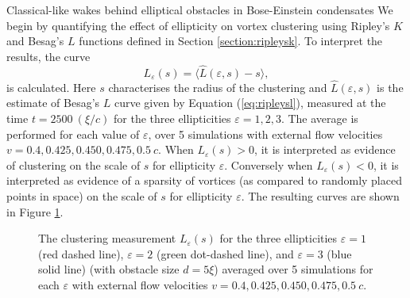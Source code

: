 \begin{chapter}{\label{cha:wake}Classical-like wakes behind elliptical obstacles in Bose-Einstein condensates}
We begin by quantifying the effect of ellipticity on vortex clustering using Ripley's $K$ and Besag's $L$ functions defined in Section \ref{section:ripleysk}. To interpret the results, the curve 
\begin{equation}
  L_\varepsilon(s) = \langle \hat{L}(\varepsilon,s) - s \rangle,
\end{equation}
is calculated. Here $s$ characterises the radius of the clustering and $\hat{L}(\varepsilon,s)$ is the estimate of Besag's $L$ curve given by Equation (\ref{eq:ripleysl}), measured at the time $t=2500~(\xi/c)$ for the three ellipticities $\varepsilon=1, 2, 3$. The average is performed for each value of $\varepsilon$, over 5 simulations with external flow velocities $v = 0.4,0.425,0.450,0.475,0.5~c$. When $L_\varepsilon(s)>0$, it is interpreted as evidence of clustering on the scale of $s$ for ellipticity $\varepsilon$. Conversely when $L_\varepsilon(s)<0$, it is interpreted as evidence of a sparsity of vortices (as compared to randomly placed points in space) on the scale of $s$ for ellipticity $\varepsilon$. The resulting curves are shown in Figure \ref{fig:ripleyLwake}.

\begin{figure}
\begin{center}
\end{center}
\caption{\label{fig:ripleyLwake} The clustering measurement $L_\varepsilon(s)$ for the three ellipticities $\varepsilon=1$ (red dashed line), $\varepsilon=2$ (green dot-dashed line), and $\varepsilon=3$ (blue solid line) (with obstacle size $d=5\xi$) averaged over 5 simulations for each $\varepsilon$ with external flow velocities $v = 0.4,0.425,0.450,0.475,0.5~c$.}
\end{figure}


\end{chapter}
